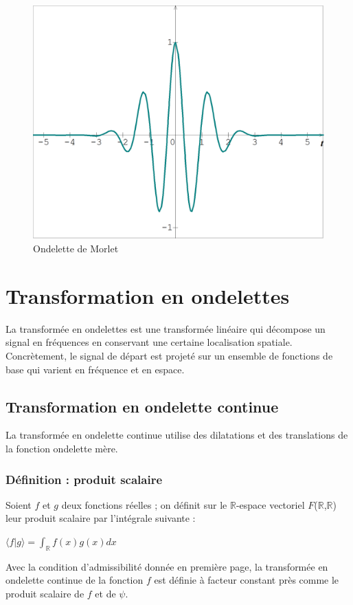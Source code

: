 \documentclass{article}
\begin{document}
\begin{figure}[!h]
\centering
\includegraphics[scale=0.2]{images/morlet.png}
\caption{Ondelette de Morlet}
\label{morlet}
\end{figure}

\pagebreak

\section{Transformation en ondelettes}

La transformée en ondelettes est une transformée linéaire qui décompose un signal en fréquences en conservant une certaine localisation spatiale. Concrètement, le signal de départ est projeté sur un ensemble de fonctions de base qui varient en fréquence et en espace. 

\subsection{Transformation en ondelette continue}

La transformée en ondelette continue utilise des dilatations et des translations de la fonction ondelette mère. 

\subsubsection*{Définition : produit scalaire}

Soient $f$ et $g$ deux fonctions réelles ; on définit sur le $\mathbb{R}$-espace vectoriel $F$($\mathbb{R}$,$\mathbb{R}$) leur produit scalaire par l’intégrale suivante : \\
\begin{center}
$\displaystyle \langle f|g \rangle = \int_{\mathbb{R}} f(x)g(x)dx$ \\
\end{center}
Avec la condition d’admissibilité donnée en première page, la transformée en ondelette continue de la fonction $f$ est définie à facteur constant près comme le produit scalaire de $f$ et de $\psi$. \\
\end{document}
